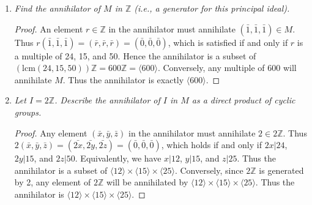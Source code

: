 \documentclass{article}
\begin{document}
  \begin{enumerate}[label={(\alph*)}]
    \item \it Find the annihilator of $M$ in $\mathbb{Z}$ (i.e., a
      generator for this principal ideal).

      \begin{proof}
        An element $r\in\mathbb{Z}$ in the annihilator must annihilate
        $(\bar{1},\bar{1},\bar{1})\in M$. Thus $r(\bar{1},\bar{1},\bar{1})
        =(\bar{r},\bar{r},\bar{r}) =(\bar{0},\bar{0},\bar{0})$, which is
        satisfied if and only if $r$ is a multiple of 24, 15, and 50. Hence
        the annihilator is a subset of $(\text{lcm}(24,15,50))\mathbb{Z}
        =600\mathbb{Z} =\langle600\rangle$. Conversely, any multiple of 600
        will annihilate $M$. Thus the annihilator is exactly
        $\langle600\rangle$.
      \end{proof}

    \item \it Let $I=2\mathbb{Z}$. Describe the annihilator of $I$ in $M$
      as a direct product of cyclic groups.

      \begin{proof}
        Any element $(\bar{x},\bar{y},\bar{z})$ in the annihilator must
        annihilate $2\in2\mathbb{Z}$. Thus $2(\bar{x},\bar{y},\bar{z})
        =(\bar{2x},\bar{2y},\bar{2z}) =(\bar{0},\bar{0},\bar{0})$, which
        holds if and only if $2x|24$, $2y|15$, and $2z|50$. Equivalently,
        we have $x|12$, $y|15$, and $z|25$. Thus the annihilator is a
        subset of $\langle12\rangle \times\langle15\rangle \times
        \langle25\rangle$. Conversely, since $2\mathbb{Z}$ is generated by
        2, any element of $2\mathbb{Z}$ will be annihilated by
        $\langle12\rangle \times\langle15\rangle \times \langle25\rangle$.
        Thus the annihilator is $\langle12\rangle \times\langle15\rangle
        \times \langle25\rangle$.
      \end{proof}
  \end{enumerate}
\end{document}
